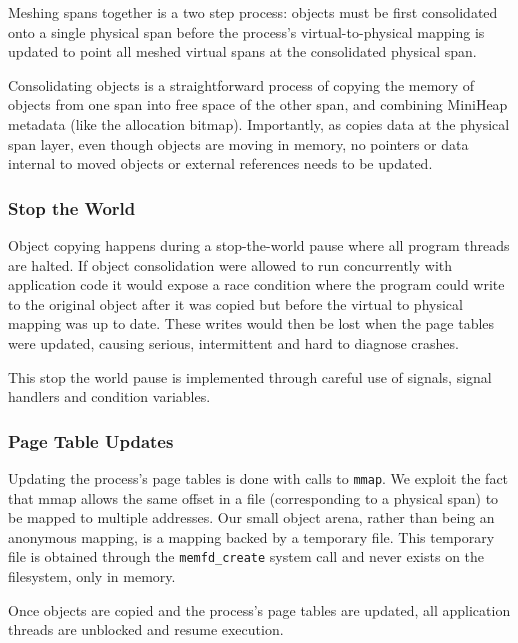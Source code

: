 Meshing spans together is a two step process: objects must be first
consolidated onto a single physical span before the process's
virtual-to-physical mapping is updated to point all meshed virtual
spans at the consolidated physical span.

Consolidating objects is a straightforward process of copying the
memory of objects from one span into free space of the other span, and
combining MiniHeap metadata (like the allocation bitmap).
Importantly, as \Mesh copies data at the physical span layer, even
though objects are moving in memory, no pointers or data internal to
moved objects or external references needs to be updated.

\subsubsection{Stop the World}

Object copying happens during a stop-the-world pause where all program
threads are halted.  If object consolidation were allowed to run
concurrently with application code it would expose a race condition
where the program could write to the original object after it was
copied but before the virtual to physical mapping was up to date.
These writes would then be lost when the page tables were updated,
causing serious, intermittent and hard to diagnose crashes.

This stop the world pause is implemented through careful use of
signals, signal handlers and condition variables.

\subsubsection{Page Table Updates}

Updating the process's page tables is done with calls to
\texttt{mmap}.  We exploit the fact that mmap allows the same offset
in a file (corresponding to a physical span) to be mapped to multiple
addresses.  Our small object arena, rather than being an anonymous
mapping, is a mapping backed by a temporary file.  This temporary file
is obtained through the \texttt{memfd\_create} system call and never
exists on the filesystem, only in memory.

Once objects are copied and the process's page tables are updated, all
application threads are unblocked and resume execution.
